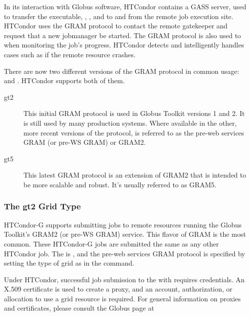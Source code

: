 In its interaction with Globus software,
HTCondor contains a GASS server, used to transfer the executable,
, , and  to and from
the remote job execution site.
HTCondor uses the GRAM protocol to contact the remote gatekeeper
and request that a new jobmanager be started.
The GRAM protocol is also used to when monitoring the job's progress.
HTCondor detects and intelligently handles cases
such as if the remote resource crashes.

There are now two different versions of the GRAM protocol in common
usage:  and .
HTCondor supports both of them.
\begin{description}
\item[gt2]
This initial GRAM protocol is used in Globus Toolkit versions 1 and 2.
It is still used by many production systems.
Where available in the other, more recent versions of the protocol,
 is referred to as the pre-web services GRAM 
(or pre-WS GRAM) or GRAM2.

\item[gt5]
This latest GRAM protocol is an extension of GRAM2 that is intended to
be more scalable and robust. It's usually referred to as GRAM5.
\end{description}

\subsubsection{\label{sec:Using-gt2}The gt2 Grid Type}

HTCondor-G supports submitting jobs to remote resources running
the Globus Toolkit's GRAM2 (or pre-WS GRAM) service. This flavor of GRAM
is the most common.
These HTCondor-G jobs are submitted the same as any other HTCondor job.
The  is ,
and the pre-web services GRAM protocol is specified by
setting the type of grid as  in the 
command.

Under HTCondor, successful job submission to the  
 with 
requires credentials.
An X.509 certificate is used to create a proxy,
and an account, authorization, or allocation to use a grid resource
is required.
For general information on proxies and certificates,
please consult the Globus page at 

